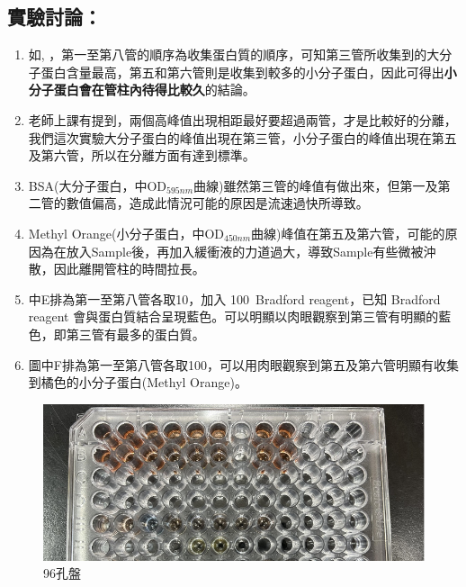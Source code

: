 \subsection*{實驗討論：}
\begin{enumerate}[label=\arabic*.]
  \item 如, ，第一至第八管的順序為收集蛋白質的順序，可知第三管所收集到的大分子蛋白含量最高，第五和第六管則是收集到較多的小分子蛋白，因此可得出\textbf{小分子蛋白會在管柱內待得比較久}的結論。
  \item 老師上課有提到，兩個高峰值出現相距最好要超過兩管，才是比較好的分離，我們這次實驗大分子蛋白的峰值出現在第三管，小分子蛋白的峰值出現在第五及第六管，所以在分離方面有達到標準。
  \item BSA(大分子蛋白，中OD$_{595nm}$曲線)雖然第三管的峰值有做出來，但第一及第二管的數值偏高，造成此情況可能的原因是流速過快所導致。
  \item Methyl Orange(小分子蛋白，中OD$_{450nm}$曲線)峰值在第五及第六管，可能的原因為在放入Sample後，再加入緩衝液的力道過大，導致Sample有些微被沖散，因此離開管柱的時間拉長。
  \item {}中E排為第一至第八管各取10\mul ，加入 100\mul\ Bradford reagent，已知 Bradford reagent 會與蛋白質結合呈現藍色。可以明顯以肉眼觀察到第三管有明顯的藍色，即第三管有最多的蛋白質。
  \item {}圖中F排為第一至第八管各取100\mul，可以用肉眼觀察到第五及第六管明顯有收集到橘色的小分子蛋白(Methyl Orange)。
  
  
\end{enumerate}


\begin{figure}[H]
\centering
\includegraphics[width=.8\textwidth]{paste_src/2023-10-22-16-03-54.png}
\caption{96孔盤}
\label{fig:96}
\end{figure}

 

